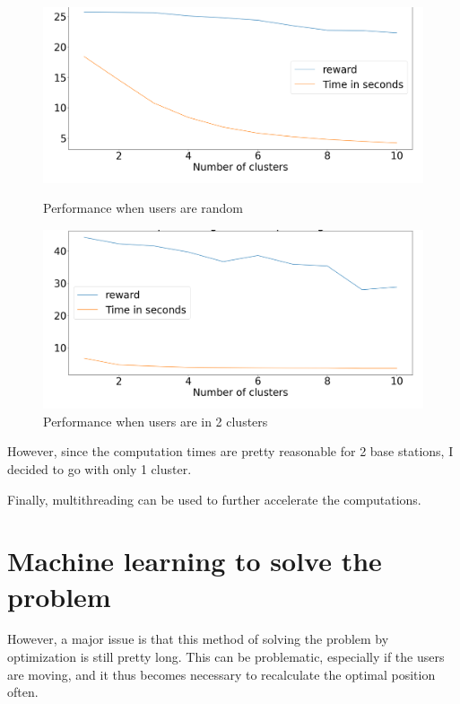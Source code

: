 \documentclass[letterpaper]{article}
\begin{document}
\begin{figure}[H]
    \centering
    \begin{minipage}[b]{0.45\textwidth}
        \centering
        \includegraphics[width=\textwidth]{images/Performance_opt_function_clusters.png}
        \caption{Performance when users are random}
    \end{minipage}
    \hspace{0.05\textwidth}
    \begin{minipage}[b]{0.45\textwidth}
        \centering
        \includegraphics[width=\textwidth]{images/Performance_opt_function_clusters_when_2clusters.png}
        \caption{Performance when users are in 2 clusters}
    \end{minipage}
\end{figure}

However, since the computation times are pretty reasonable for 2 base stations, I decided to go with only 1 cluster.

Finally, multithreading can be used to further accelerate the computations.

\section{Machine learning to solve the problem}

However, a major issue is that this method of solving the problem by optimization is still pretty long.
This can be problematic, especially if the users are moving, and it thus becomes necessary to recalculate the optimal position often.
\end{document}
